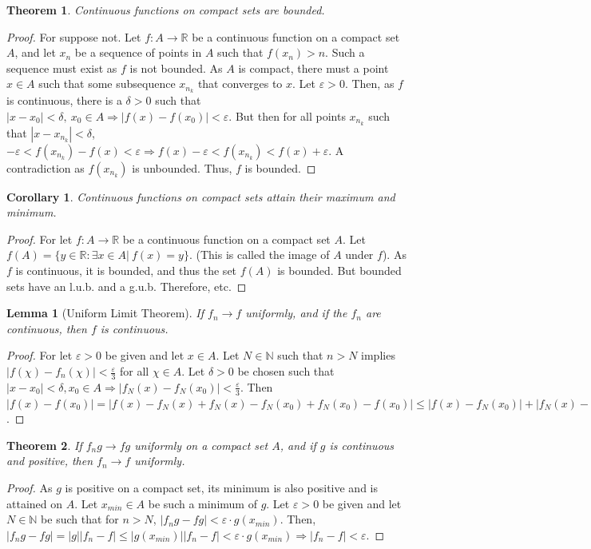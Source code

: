 \documentclass[12pt,oneside]{book}
\theoremstyle{mystyle}
\newtheorem{theorem}{Theorem}[section]
\newtheorem{lemma}{Lemma}[section]
\newtheorem{corollary}{Corollary}[section]
\begin{document}
\begin{theorem}
Continuous functions on compact sets are bounded.
\end{theorem}
\begin{proof}
For suppose not. Let $f:A\rightarrow \mathbb{R}$ be a continuous function on a compact set $A$, and let $x_n$ be a sequence of points in $A$ such that $f(x_n)>n$. Such a sequence must exist as $f$ is not bounded. As $A$ is compact, there must a point $x\in A$ such that some subsequence $x_{n_k}$ that converges to $x$. Let $\varepsilon >0$. Then, as $f$ is continuous, there is a $\delta>0$ such that $|x-x_0|<\delta,\ x_0\in A\Rightarrow |f(x)-f(x_0)|<\varepsilon$. But then for all points $x_{n_k}$ such that $|x-x_{n_k}|<\delta$, $-\varepsilon<f(x_{n_k})-f(x)<\varepsilon \Rightarrow f(x)-\varepsilon < f(x_{n_k})<f(x)+\varepsilon$. A contradiction as $f(x_{n_k})$ is unbounded. Thus, $f$ is bounded.
\end{proof}

\begin{corollary}
Continuous functions on compact sets attain their maximum and minimum.
\end{corollary}
\begin{proof}
For let $f:A\rightarrow \mathbb{R}$ be a continuous function on a compact set $A$. Let $f(A) = \{y\in \mathbb{R}:\exists x\in A|\ f(x)=y\}$. (This is called the image of $A$ under $f$). As $f$ is continuous, it is bounded, and thus the set $f(A)$ is bounded. But bounded sets have an l.u.b. and a g.u.b. Therefore, etc.
\end{proof}

\begin{lemma}[Uniform Limit Theorem]
If $f_n\rightarrow f$ uniformly, and if the $f_n$ are continuous, then $f$ is continuous.
\end{lemma}
\begin{proof}
For let $\varepsilon>0$ be given and let $x\in A$. Let $N\in \mathbb{N}$ such that $n>N$ implies $|f(\chi)-f_n(\chi)|<\frac{\varepsilon}{3}$ for all $\chi\in A$. Let $\delta>0$ be chosen such that $|x-x_0|<\delta, x_0\in A\Rightarrow |f_N(x)-f_N(x_0)|<\frac{\varepsilon}{3}$. Then  $|f(x)-f(x_0)|=|f(x)-f_N(x)+f_N(x)-f_N(x_0)+f_N(x_0)-f(x_0)|\leq |f(x)-f_N(x_0)|+|f_N(x)-f_N(x_0)|+|f(x_0)-f_N(x_0)|<\varepsilon$.
\end{proof}

\begin{theorem}
If $f_ng\rightarrow fg$ uniformly on a compact set $A$, and if $g$ is continuous and positive, then $f_n\rightarrow f$ uniformly.
\end{theorem}
\begin{proof}
As $g$ is positive on a compact set, its minimum is also positive and is attained on $A$. Let $x_{min}\in A$ be such a minimum of $g$. Let $\varepsilon>0$ be given and let $N\in \mathbb{N}$ be such that for $n>N$, $|f_ng-fg|<\varepsilon\cdot g(x_{min})$. Then, $|f_ng-fg|=|g||f_n-f|\leq |g(x_{min})||f_n-f|<\varepsilon \cdot g(x_{min})\Rightarrow |f_n-f|<\varepsilon$.
\end{proof}
\end{document}
